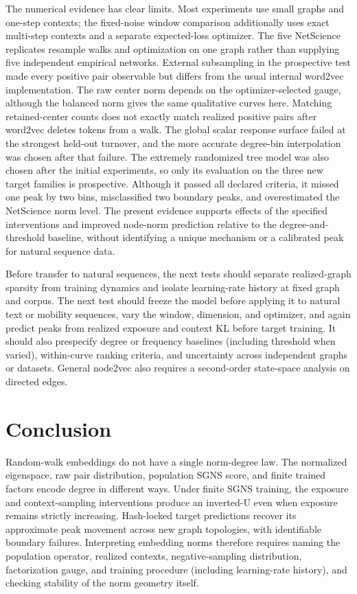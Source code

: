 \documentclass[aps,pre,reprint,superscriptaddress,longbibliography]{revtex4-2}
\begin{document}
The numerical evidence has clear limits.
Most experiments use small graphs and one-step contexts; the fixed-noise window comparison additionally uses exact multi-step contexts and a separate expected-loss optimizer.
The five NetScience replicates resample walks and optimization on one graph rather than supplying five independent empirical networks.
External subsampling in the prospective test made every positive pair observable but differs from the usual internal word2vec implementation.
The raw center norm depends on the optimizer-selected gauge, although the balanced norm gives the same qualitative curves here.
Matching retained-center counts does not exactly match realized positive pairs after word2vec deletes tokens from a walk.
The global scalar response surface failed at the strongest held-out turnover, and the more accurate degree-bin interpolation was chosen after that failure.
The extremely randomized tree model was also chosen after the initial experiments, so only its evaluation on the three new target families is prospective.
Although it passed all declared criteria, it missed one peak by two bins, misclassified two boundary peaks, and overestimated the NetScience norm level.
The present evidence supports effects of the specified interventions and improved node-norm prediction relative to the degree-and-threshold baseline, without identifying a unique mechanism or a calibrated peak for natural sequence data.

Before transfer to natural sequences, the next tests should separate realized-graph sparsity from training dynamics and isolate learning-rate history at fixed graph and corpus.
The next test should freeze the model before applying it to natural text or mobility sequences, vary the window, dimension, and optimizer, and again predict peaks from realized exposure and context KL before target training.
It should also prespecify degree or frequency baselines (including threshold when varied), within-curve ranking criteria, and uncertainty across independent graphs or datasets.
General node2vec also requires a second-order state-space analysis on directed edges.

\section{Conclusion}

Random-walk embeddings do not have a single norm-degree law.
The normalized eigenspace, raw pair distribution, population SGNS score, and finite trained factors encode degree in different ways.
Under finite SGNS training, the exposure and context-sampling interventions produce an inverted-U even when exposure remains strictly increasing.
Hash-locked target predictions recover its approximate peak movement across new graph topologies, with identifiable boundary failures.
Interpreting embedding norms therefore requires naming the population operator, realized contexts, negative-sampling distribution, factorization gauge, and training procedure (including learning-rate history), and checking stability of the norm geometry itself.
\end{document}
